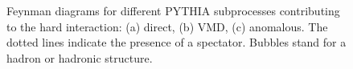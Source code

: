 \begin{figure} 
\begin{center} 
\quad 
{} 
\quad
{}
\caption[PYTIHIA subprocess categories for different photon structure]{Feynman diagrams for different
PYTHIA subprocesses contributing to the hard interaction: (a) direct, (b) VMD,
(c) anomalous. The dotted lines indicate the presence of a spectator. Bubbles
stand for a hadron or hadronic structure.}
\label{fig:PYTHIAFeyn} 
\end{center} 
\end{figure}


